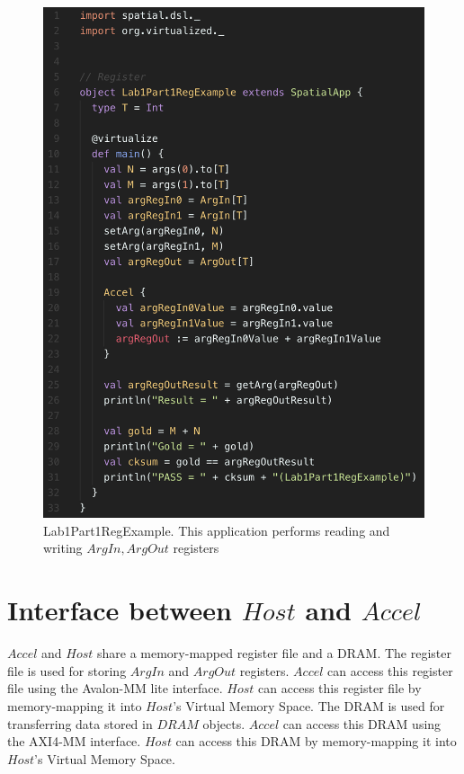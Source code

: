 \documentclass{article}
\begin{document}
\begin{figure}
\centering
\includegraphics[scale=0.6]{regexample.png}
\caption{Lab1Part1RegExample. This application performs reading and writing $ArgIn, ArgOut$ registers}
\label{fig:arginout}
\end{figure}

\section{Interface between $Host$ and $Accel$}
$Accel$ and $Host$ share a memory-mapped register file and a DRAM.
The register file is used for storing $ArgIn$ and $ArgOut$ registers.
$Accel$ can access this register file using the Avalon-MM lite interface.
$Host$ can access this register file by memory-mapping it into $Host$'s Virtual Memory Space.
The DRAM is used for transferring data stored in $DRAM$ objects.
$Accel$ can access this DRAM using the AXI4-MM interface.
$Host$ can access this DRAM by memory-mapping it into $Host$'s Virtual Memory Space.
\end{document}
